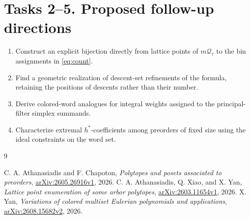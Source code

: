 \documentclass[11pt]{article}
\newcommand{\Q}{\mathcal Q}
\begin{document}
\section*{Tasks 2--5. Proposed follow-up directions}
\begin{enumerate}[label=\textbf{Task \arabic*.},start=2,leftmargin=*]
\item Construct an explicit bijection directly from lattice points
of $m\Q_\tau$ to the bin assignments in \eqref{eq:count}.
\item Find a geometric realization of descent-set refinements of
the formula, retaining the positions of descents rather than their number.
\item Derive colored-word analogues for integral weights assigned
to the principal-filter simplex summands.
\item Characterize extremal $h^*$-coefficients among preorders of
fixed size using the ideal constraints on the word set.
\end{enumerate}
\begin{thebibliography}{9}
\raggedright
{} C. A. Athanasiadis and F. Chapoton,
\emph{Polytopes and posets associated to preorders},
\href{https://arxiv.org/abs/2605.26916v1}{arXiv:2605.26916v1}, 2026.
 C. A. Athanasiadis, Q. Xiao, and X. Yan,
\emph{Lattice point enumeration of some arbor polytopes},
\href{https://arxiv.org/abs/2603.11654v1}{arXiv:2603.11654v1}, 2026.
 X. Yan, \emph{Variations of colored multiset Eulerian
polynomials and applications},
\href{https://arxiv.org/abs/2608.15682v2}{arXiv:2608.15682v2}, 2026.
\end{thebibliography}
\end{document}

